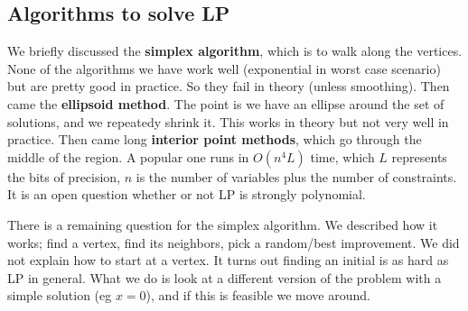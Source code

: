 \subsection{Algorithms to solve LP}
We briefly discussed the \textbf{simplex algorithm}, which is to walk along the vertices. None of the algorithms we have work well (exponential in worst case scenario) but are pretty good in practice. So they fail in theory (unless smoothing). Then came the \textbf{ellipsoid method}. The point is we have an ellipse around the set of solutions, and we repeatedy shrink it. This works in theory but not very well in practice. Then came long \textbf{interior point methods}, which go through the middle of the region. A popular one runs in $O(n^4 L)$ time, which $L$ represents the bits of precision, $n$ is the number of variables plus the number of constraints. It is an open question whether or not LP is strongly polynomial.

There is a remaining question for the simplex algorithm. We described how it works; find a vertex, find its neighbors, pick a random/best improvement. We did not explain how to start at a vertex. It turns out finding an initial is as hard as LP in general. What we do is look at a different version of the problem with a simple solution (eg $x=0$), and if this is feasible we move around.

